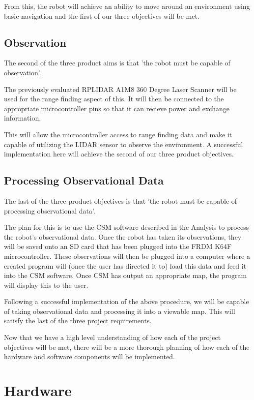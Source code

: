 		From this, the robot will achieve an ability to move around an environment using basic navigation and the first of our three objectives will be met.
			
		\subsection{Observation}
		The second of the three product aims is that 'the robot must be capable of observation'.
			
		The previously evaluated RPLIDAR A1M8 360 Degree Laser Scanner will be used for the range finding aspect of this. It will then be connected to the appropriate microcontroller pins so that it can recieve power and exchange information.
			
		This will allow the microcontroller access to range finding data and make it capable of utilizing the LIDAR sensor to observe the environment. A successful implementation here will achieve the second of our three product objectives.
			
		\subsection{Processing Observational Data}
		The last of the three product objectives is that 'the robot must be capable of processing observational data'.
		
		The plan for this is to use the CSM software described in the Analysis to process the robot's observational data. Once the robot has taken its observations, they will be saved onto an SD card that has been plugged into the FRDM K64F microcontroller. These observations will then be plugged into a computer where a created program will (once the user has directed it to) load this data and feed it into the CSM software. Once CSM has output an appropriate map, the program will display this to the user.
		
		Following a successful implementation of the above procedure, we will be capable of taking observational data and processing it into a viewable map. This will satisfy the last of the three project requirements.
	
	\medskip
	Now that we have a high level understanding of how each of the project objectives will be met, there will be a more thorough planning of how each of the hardware and software components will be implemented.
	
	\section{Hardware}
